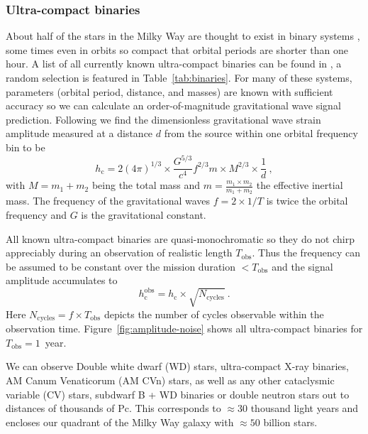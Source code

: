 \documentclass[fleqn,10pt]{<approot>/designer/latexelements/SelfArx} %
\begin{document}
\subsubsection{Ultra-compact binaries}
About half of the stars in the Milky Way are thought to exist in binary systems \cite{horch2014most}, some times even in orbits so compact that orbital periods are shorter than one hour. 
A list of all currently known ultra-compact binaries can be found in \cite{LISAwiki}, a random selection is featured in Table~\ref{tab:binaries}. For many of these systems, parameters (orbital period, distance, and masses) are known with sufficient accuracy so we can calculate an order-of-magnitude gravitational wave signal prediction. Following \cite{LectureA} we find the dimensionless gravitational wave strain amplitude measured at a distance $d$ from the source within one orbital frequency bin to be
\begin{equation}
h_\text{c} = 2\left(4\pi\right)^{1/3} \times \frac{G^{5/3}}{c^4} f^{2/3}  m\times M^{2/3} \times \frac{1}{d}~, 
\label{eq:binaryamplitude}
\end{equation}
with $M=m_1+m_2$ being the total mass and $m=\frac{m_1 \times m_2}{m_1+m_2}$ the effective inertial mass. The frequency of the gravitational waves $f=2\times1/T$ is twice the orbital frequency and $G$ is the gravitational constant. 

All known ultra-compact binaries are quasi-monochromatic so they do not chirp appreciably during an observation of realistic length $T_\text{obs}$. Thus the frequency can be assumed to be constant over the mission duration $< T_\text{obs}$ and the signal amplitude accumulates to
\begin{equation}
h_\text{c}^\text{obs} = h_\text{c} \times \sqrt{N_\text{cycles}}~.
\label{eq:binaryamplitudeyear}
\end{equation}
Here $N_\text{cycles}=f\times T_\text{obs}$ depicts the number of cycles observable within the observation time. Figure~\ref{fig:amplitude-noise} shows all ultra-compact binaries for $T_\text{obs} = 1$~year.

We can observe Double white dwarf (WD) stars, ultra-compact X-ray binaries, AM Canum Venaticorum (AM CVn) stars, as well as any other cataclysmic variable (CV) stars, subdwarf B + WD binaries or double neutron stars out to distances of thousands of Pc. This corresponds to $\approx 30$ thousand light years and encloses our quadrant of the Milky Way galaxy with $\approx 50$ billion stars.\\
\end{document}
